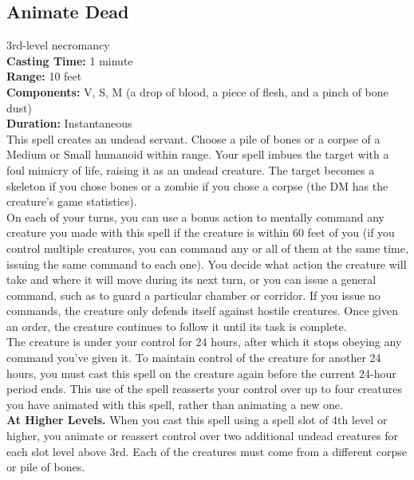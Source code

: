 \documentclass[11pt, A4paper, english]{article}
\begin{document}
		\subsection{Animate Dead}
3rd-level necromancy \\
\textbf{Casting Time:} 1 minute \\
\textbf{Range:} 10 feet \\
\textbf{Components:} V, S, M (a drop of blood, a piece of flesh, and a pinch of bone dust) \\
\textbf{Duration:} Instantaneous \\
This spell creates an undead servant. Choose a pile of bones or a corpse of a Medium or Small humanoid within range. Your spell imbues the target with a foul mimicry of life, raising it as an undead creature. The target becomes a skeleton if you chose bones or a zombie if you chose a corpse (the DM has the creature’s game statistics). \\
On each of your turns, you can use a bonus action to mentally command any creature you made with this spell if the creature is within 60 feet of you (if you control multiple creatures, you can command any or all of them at the same time, issuing the same command to each one). You decide what action the creature will take and where it will move during its next turn, or you can issue a general command, such as to guard a particular chamber or corridor. If you issue no commands, the creature only defends itself against hostile creatures. Once given an order, the creature continues to follow it until its task is complete. \\
The creature is under your control for 24 hours, after which it stops obeying any command you’ve given it. To maintain control of the creature for another 24 hours, you must cast this spell on the creature again before the current 24-hour period ends. This use of the spell reasserts your control over up to four creatures you have animated with this spell, rather than animating a new one. \\
\textbf{At Higher Levels.} When you cast this spell using a spell slot of 4th level or higher, you animate or reassert control over two additional undead creatures for each slot level above 3rd. Each of the creatures must come from a different corpse or pile of bones.
\end{document}
